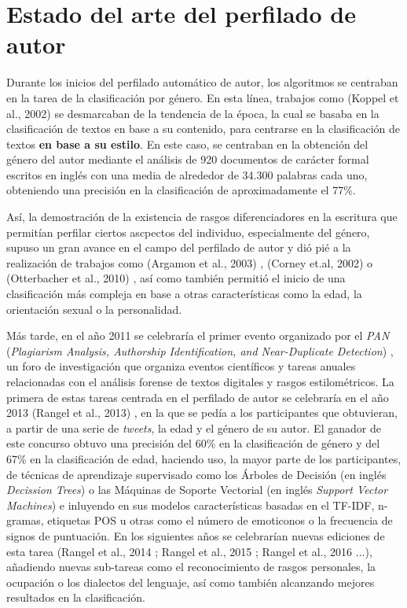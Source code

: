 \chapter{Estado del arte del perfilado de autor}
\label{chap:estadoarte}

Durante los inicios del perfilado automático de autor, los algoritmos se centraban en la tarea de la clasificación por género.
En esta línea, trabajos como (Koppel et al., 2002) \cite{koppel2002automatically} se desmarcaban de la tendencia de la época,
la cual se basaba en la clasificación de textos en base a su contenido, para centrarse en la clasificación de textos \textbf{en base a su estilo}. En este caso, se centraban en la obtención del género del autor mediante el análisis
de 920 documentos de carácter formal escritos en inglés con una media de alrededor de 34.300 palabras cada uno, obteniendo una precisión en la clasificación de
aproximadamente el 77\%.

\bigskip
Así, la demostración de la existencia de rasgos diferenciadores en la escritura que permitían perfilar ciertos ascpectos del individuo, especialmente del género, 
supuso un gran avance en el campo del perfilado de autor
y dió pié a la realización de trabajos como (Argamon et al., 2003) \cite{argamon2003gender}, (Corney et.al, 2002) \cite{corney2002gender} o (Otterbacher et al., 2010) \cite{otterbacher2010inferring}, 
así como también permitió el inicio de una clasificación más compleja en base a otras características como la edad, la orientación sexual o la personalidad.

\bigskip
Más tarde, en el año 2011 se celebraría el primer evento organizado por el \textit{PAN} (\textit{Plagiarism Analysis, Authorship Identification, and Near-Duplicate Detection}) \cite{pan},
un foro de investigación que organiza eventos científicos y tareas anuales relacionadas con el análisis forense de textos digitales
y rasgos estilométricos. La primera de estas tareas centrada en el perfilado de autor se celebraría en el año 2013 (Rangel et al., 2013) \cite{rangel2013overview},
en la que se pedía a los participantes que obtuvieran, a partir de una serie de \textit{tweets}, la edad y el género de su autor. El ganador de este concurso obtuvo una
precisión del 60\% en la clasificación de género y del 67\% en la clasificación de edad, haciendo uso, la mayor parte de los participantes, de técnicas de aprendizaje
supervisado como los Árboles de Decisión (en inglés \textit{Decission Trees}) o las Máquinas de Soporte Vectorial (en inglés \textit{Support Vector Machines}) e inluyendo
en sus modelos características basadas en el TF-IDF, n-gramas, etiquetas POS u otras como el número de emoticonos o la frecuencia de signos de puntuación.
En los siguientes años se celebrarían nuevas ediciones de esta tarea (Rangel et al., 2014 \cite{rangel2014overview}; Rangel et al., 2015 \cite{rangel2015overview};
Rangel et al., 2016 \cite{rangel2016overview}...), añadiendo nuevas sub-tareas como el reconocimiento de rasgos personales, la ocupación o los dialectos del lenguaje,
así como también alcanzando mejores resultados en la clasificación.

